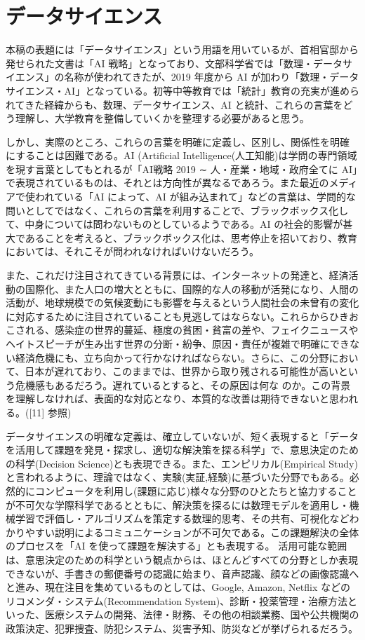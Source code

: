\documentclass[
]{book}
\theoremstyle{definition}
\theoremstyle{definition}
\theoremstyle{definition}
\theoremstyle{definition}
\theoremstyle{remark}
\begin{document}
\hypertarget{ux30c7ux30fcux30bfux30b5ux30a4ux30a8ux30f3ux30b9}{%
\section{データサイエンス}\label{ux30c7ux30fcux30bfux30b5ux30a4ux30a8ux30f3ux30b9}}

本稿の表題には「データサイエンス」という用語を用いているが、首相官邸から発せられた文書は「AI 戦略」となっており、文部科学省では「数理・データサイエンス」の名称が使われてきたが、2019 年度から AI が加わり「数理・データサイエンス・AI」となっている。初等中等教育では「統計」教育の充実が進められてきた経緯からも、数理、データサイエンス、AI と統計、これらの言葉をどう理解し、大学教育を整備していくかを整理する必要があると思う。

しかし、実際のところ、これらの言葉を明確に定義し、区別し、関係性を明確にすることは困難である。AI (Artificial Intelligence(人工知能)は学問の専門領域を現す言葉としてもとれるが「AI戦略 2019 ∼ 人・産業・地域・政府全てに AI」で表現されているものは、それとは方向性が異なるであろう。また最近のメディアで使われている「AI によって、AI が組み込まれて」などの言葉は、学問的な問いとしてではなく、これらの言葉を利用することで、ブラックボックス化して、中身については問わないものとしているようである。AI の社会的影響が甚大であることを考えると、ブラックボックス化は、思考停止を招いており、教育においては、それこそが問われなければいけないだろう。

また、これだけ注目されてきている背景には、インターネットの発達と、経済活動の国際化、また人口の増大とともに、国際的な人の移動が活発になり、人間の活動が、地球規模での気候変動にも影響を与えるという人間社会の未曾有の変化に対応するために注目されていることも見逃してはならない。これらからひきおこされる、感染症の世界的蔓延、極度の貧困・貧富の差や、フェイクニュースやヘイトスピーチが生み出す世界の分断・紛争、原因・責任が複雑で明確にできない経済危機にも、立ち向かって行かなければならない。さらに、この分野において、日本が遅れており、このままでは、世界から取り残される可能性が高いという危機感もあるだろう。遅れているとすると、その原因は何な
のか。この背景を理解しなければ、表面的な対応となり、本質的な改善は期待できないと思われる。({[}11{]} 参照)

データサイエンスの明確な定義は、確立していないが、短く表現すると「データを活用して課題を発見・探求し、適切な解決策を探る科学」で、意思決定のための科学(Decision Science)とも表現できる。また、エンピリカル(Empirical Study)と言われるように、理論ではなく、実験(実証,経験)に基づいた分野でもある。必然的にコンピュータを利用し(課題に応じ)様々な分野のひとたちと協力することが不可欠な学際科学であるとともに、解決策を探るには数理モデルを適用し・機械学習で評価し・アルゴリズムを策定する数理的思考、その共有、可視化などわかりやすい説明によるコミュニケーションが不可欠である。この課題解決の全体のプロセスを「AI を使って課題を解決する」とも表現する。 活用可能な範囲は、意思決定のための科学という観点からは、ほとんどすべての分野としか表現できないが、手書きの郵便番号の認識に始まり、音声認識、顔などの画像認識へと進み、現在注目を集めているものとしては、Google, Amazon, Netflix などのリコメンダ・システム(Recommendation System)、診断・投薬管理・治療方法といった、医療システムの開発、法律・財務、その他の相談業務、国や公共機関の政策決定、犯罪捜査、防犯システム、災害予知、防災などが挙げられるだろう。
\end{document}
